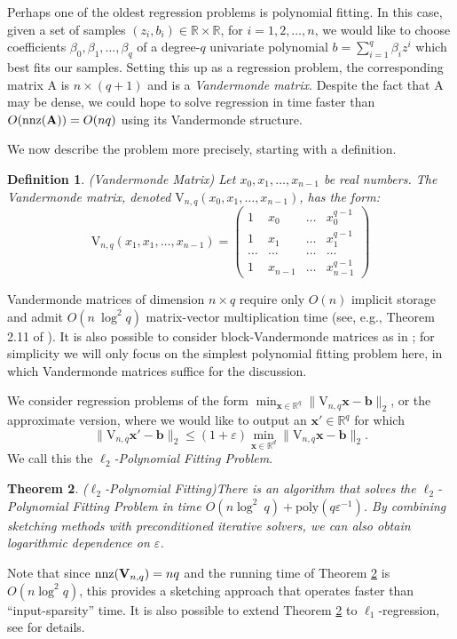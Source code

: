 \documentclass[11pt]{article}
\newtheorem{theorem}{Theorem}
\newtheorem{definition}[theorem]{Definition}
\newcommand{\mat}[1]{{\ensuremath{\bm{\mathrm{#1}}}}}
\def\b{{\mathbf b}}
\def\matA{\mat{A}}
\def\matV{\mat{V}}
\def\nnz{{ \rm nnz }}
\def\x{{\mathbf x}}
\def\b{{\mathbf b}}
\newcommand{\eps}{\varepsilon}
\newcommand{\poly}{{\mathrm{poly}}}
\begin{document}
Perhaps one of the oldest
regression problems is polynomial fitting. In this case, given a set of samples 
$(z_i, b_i) \in \mathbb{R} \times \mathbb{R}$, for $i = 1, 2, \ldots, n$, we would like to
choose coefficients $\beta_0, \beta_1, \ldots, \beta_q$ of a degree-$q$ univariate polynomial
$b = \sum_{i=1}^q \beta_i z^i$ which best fits our samples. Setting this up as a regression
problem, the corresponding matrix $\matA$ is $n \times (q+1)$ and is a {\it Vandermonde matrix}.
Despite the fact that $\matA$ may be dense, we could hope to solve regression in time faster
than $O(\nnz(\matA)) = O(nq)$ using its Vandermonde structure. 

We now describe the problem more precisely, starting with a definition. 

\begin{definition}(Vandermonde Matrix) Let $x_0, x_1, \ldots, x_{n-1}$ be real numbers. The Vandermonde matrix,
denoted $\matV_{n,q}(x_0, x_1, \ldots, x_{n-1})$, has the form:
\[ \matV_{n,q}(x_1, x_1, \ldots, x_{n-1}) = \left ( \begin{array}{cccc}
1 & x_0 & \ldots & x_0^{q-1}\\
1 & x_1 & \ldots & x_1^{q-1}\\
\ldots & \ldots & \ldots & \ldots\\
1 & x_{n-1} & \ldots & x_{n-1}^{q-1} \end{array} \right ) \]
\end{definition}

Vandermonde matrices of dimension $n \times q$ require only $O(n)$
implicit storage and admit $O(n~\log^2 q)$ matrix-vector multiplication time (see, e.g., Theorem 2.11 of \cite{Tang2004}). 
It is also possible to consider block-Vandermonde matrices as in \cite{asw13}; for simplicity
we will only focus on the simplest polynomial fitting problem here, in which Vandermonde
matrices suffice for the discussion. 

We consider regression problems of the form $\min_{\x \in \mathbb{R}^q} \|\matV_{n,q}\x-\b\|_2$, or the approximate version,
where we would like to output an $\x' \in \mathbb{R}^q$ for which 
$$\|\matV_{n,q}\x'-\b\|_2 \leq (1+\eps) \min_{\x \in \mathbb{R}^d} \|\matV_{n,q}\x-\b\|_2.$$
We call this the {\it $\ell_2$-Polynomial Fitting Problem}.

\begin{theorem}($\ell_2$-Polynomial Fitting)\cite{asw13}\label{thm:FastVand}
There is an algorithm that solves the $\ell_2$-Polynomial Fitting Problem
in time $O(n \log^2~q ) + \poly(q\varepsilon^{-1})$. By
combining sketching methods with preconditioned iterative solvers, we can
also obtain logarithmic dependence on $\varepsilon$.  
\end{theorem}
Note that since $\nnz(\matV_{n,q}) = nq$ and the running time of Theorem \ref{thm:FastVand}
is $O(n\log^2 q)$, this provides a sketching approach that operates faster than ``input-sparsity'' time. It
is also possible to extend Theorem \ref{thm:FastVand} to $\ell_1$-regression, see \cite{asw13} for details. 
\end{document}
